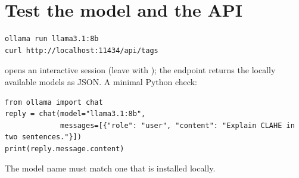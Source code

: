 \section{Test the model and the API}
\begin{lstlisting}[style=sh]
ollama run llama3.1:8b
curl http://localhost:11434/api/tags
\end{lstlisting}
 opens an interactive session (leave with ); the  endpoint returns the locally available models as JSON. A minimal Python check:
\begin{lstlisting}[style=py]
from ollama import chat
reply = chat(model="llama3.1:8b",
             messages=[{"role": "user", "content": "Explain CLAHE in two sentences."}])
print(reply.message.content)
\end{lstlisting}
The model name must match one that is installed locally.
